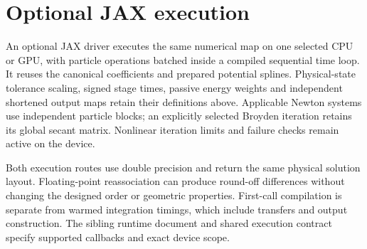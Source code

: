 \documentclass[11pt,a4paper]{article}
\begin{document}
\section{Optional JAX execution}

An optional JAX driver executes the same numerical map on one selected CPU
or GPU, with particle operations batched inside a compiled sequential time
loop. It reuses the canonical coefficients and prepared potential splines.
Physical-state tolerance scaling, signed stage times, passive energy weights
and independent shortened output maps retain their definitions above.
Applicable Newton systems use independent particle blocks; an explicitly
selected Broyden iteration retains its global secant matrix. Nonlinear
iteration limits and failure checks remain active on the device.

Both execution routes use double precision and return the same physical
solution layout. Floating-point reassociation can produce round-off
differences without changing the designed order or geometric properties.
First-call compilation is separate from warmed integration timings, which
include transfers and output construction. The sibling runtime document and
shared execution contract specify supported callbacks and exact device scope.
\end{document}
